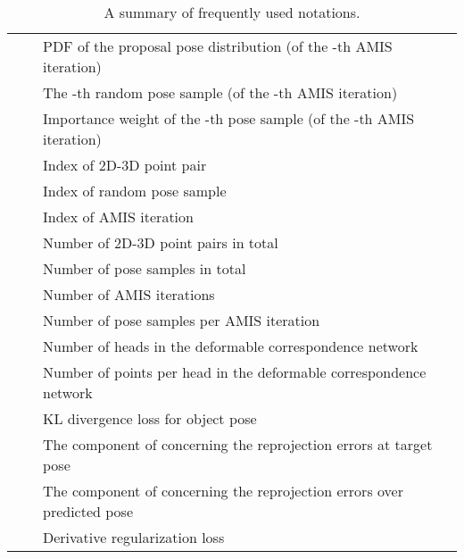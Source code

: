 \documentclass[10pt,twocolumn,letterpaper]{article}
\begin{document}
\begin{table*}[b]
\begin{center}
{\begin{tabular}{cll}
         & & PDF of the proposal pose distribution (of the -th AMIS iteration)\\
         & & The -th random pose sample (of the -th AMIS iteration)\\
         & & Importance weight of the -th pose sample (of the -th AMIS iteration)\\
        
         & & Index of 2D-3D point pair\\
         & & Index of random pose sample\\
         & & Index of AMIS iteration\\
         & & Number of 2D-3D point pairs in total\\
         & & Number of pose samples in total\\
         & & Number of AMIS iterations\\
         & & Number of pose samples per AMIS iteration\\
         & & Number of heads in the deformable correspondence network\\
         & & Number of points per head in the deformable correspondence network\\
         & & KL divergence loss for object pose\\
         & & The component of  concerning the reprojection errors at target pose\\
         & & The component of  concerning the reprojection errors over predicted pose\\
         & & Derivative regularization loss\\
\bottomrule
    \end{tabular}}
    \end{center}
    \vspace{-1ex}
    \caption{A summary of frequently used notations.} 
    \vspace*{2.2cm}
    \label{tab:notation}
\end{table*}

\clearpage
\end{document}
